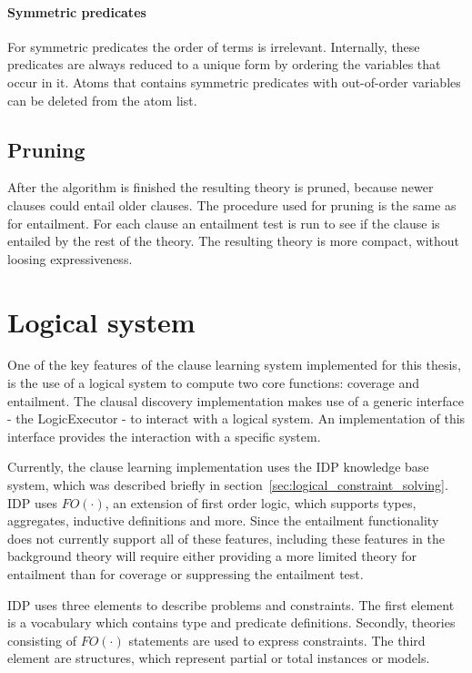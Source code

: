 
\paragraph{Symmetric predicates}
For symmetric predicates the order of terms is irrelevant.
Internally, these predicates are always reduced to a unique form by ordering the variables that  occur in it.
Atoms that contains symmetric predicates with out-of-order variables can be deleted from the atom list.

\subsection{Pruning}
After the algorithm is finished the resulting theory is pruned, because newer clauses could entail older clauses.
The procedure used for pruning is the same as for entailment.
For each clause an entailment test is run to see if the clause is entailed by the rest of the theory.
The resulting theory is more compact, without loosing expressiveness.

\section{Logical system}
\label{sec:logical_system}
One of the key features of the clause learning system implemented for this thesis, is the use of a logical system to compute two core functions: coverage and entailment.
The clausal discovery implementation makes use of a generic  interface - the LogicExecutor - to interact with a logical system.
An implementation of this interface provides the interaction with a specific system.

Currently, the clause learning implementation uses the IDP knowledge base system, which was described briefly in section~\ref{sec:logical_constraint_solving}.
IDP uses $FO(\cdotp)$, an extension of first order logic, which supports types, aggregates, inductive definitions and more.
Since the entailment functionality does not currently support all of these features, including these features in the background theory will require either providing a more limited theory for entailment than for coverage or suppressing the entailment test.

IDP uses three elements to describe problems and constraints.
The first element is a vocabulary which contains type and predicate definitions.
Secondly, theories consisting of $FO(\cdotp)$ statements are used to express constraints.
The third element are structures, which represent partial or total instances or models.

